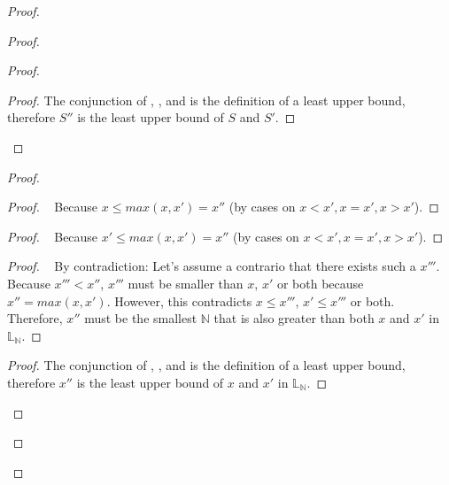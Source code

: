 \documentclass[11pt, oneside]{article}   	%
\begin{document}
\begin{proof}
\begin{proof}
\begin{proof}
			\qedstep
			\begin{proof}
				The conjunction of , , and  is the definition of a least upper bound, therefore $S''$ is the least upper bound of $S$ and $S'$.	
			\end{proof}
		\end{proof}
		
\begin{proof}
			\begin{proof}
				\pf~ Because $x \leq \textit{max}(x,x') = x''$ (by cases on $x<x', x=x', x>x'$).
			\end{proof}
			
			\begin{proof}
				\pf~ Because $x' \leq \textit{max}(x,x') = x''$ (by cases on $x<x', x=x', x>x'$).
			\end{proof}
			
			\begin{proof}
				\pf~ By contradiction: Let's assume a contrario that there exists such a $x'''$. Because $x''' < x''$, $x'''$ must be smaller than $x$, $x'$ or both because $x'' = \textit{max}(x,x')$. However, this contradicts $ x \leq x'''$,  $x' \leq x'''$ or both. Therefore, $x''$ must be the smallest $\mathds{N}$ that is also greater than both $x$ and $x'$ in $\mathds{L}_\mathds{N}$.
			\end{proof}

			\qedstep
			\begin{proof}
				The conjunction of , , and  is the definition of a least upper bound, therefore $x''$ is the least upper bound of $x$ and $x'$ in $\mathds{L}_\mathds{N}$.	
			\end{proof}
		\end{proof}
		

\end{proof}
\end{proof}
\end{document}
